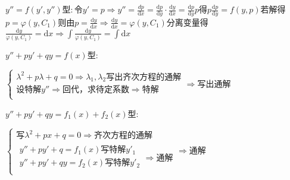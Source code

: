 \begin{spacing}{\hangju}
    $y''=f(y', y'')$型$\colon$令$y' = p \Rightarrow y'' = \frac{\mathrm{}{d}p}{\mathrm{d}x} = \frac{\mathrm{d}p}{\mathrm{d}y} \cdot \frac{\mathrm{d}y}{\mathrm{d}x} = \frac{\mathrm{d}p}{\mathrm{d}y}p$得$p\frac{\mathrm{d}p}{\mathrm{d}y} = f(y, p)$若解得$p = \varphi(y, C_1)$则由$p = \frac{\mathrm{d}y}{\mathrm{d}x} \Rightarrow \frac{\mathrm{d}y}{\mathrm{d}x} = \varphi(y, C_1)$分离变量得$\frac{\mathrm{d}y}{\varphi(y, C_1)} = \mathrm{d}x \Rightarrow \int{\frac{\mathrm{d}y}{\varphi(y, C_1)}} = \int\mathrm{d}x$

    $y'' + py' + qy = f(x)$型$\colon$

    $\left\{
        \begin{array}{l}
            \lambda^2 + p\lambda + q = 0 \Rightarrow \lambda_1, \lambda_2 \mbox{写出齐次方程的通解}\\
            \mbox{设特解}y'' \Rightarrow \mbox{回代，求待定系数} \Rightarrow \mbox{特解} \\
        \end{array}
    \right.
    \Rightarrow \mbox{写出通解}$

    $y'' + py' + qy = f_1(x) + f_2(x)$型$\colon$

    $\left\{
        \begin{array}{l}
            \mbox{写}\lambda^2 + px + q = 0 \Rightarrow \mbox{齐次方程的通解} \\
            \begin{array}{l}
                y'' + py' + q = f_1(x) \mbox{写特解}y'_1 \\
                y'' + py' + qy = f_2(x) \mbox{写特解}y'_2 \\
            \end{array} \Rightarrow \mbox{通解}
        \end{array}
    \right. \Rightarrow 通解$
\end{spacing}
